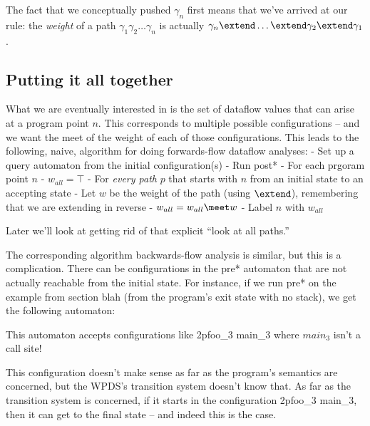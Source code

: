 \documentclass{article}
\newcommand{\config}{2}{\ensuremath{\langle #1, #2 \rangle}}
\begin{document}
\begin{defintion}
The fact that we conceptually pushed $\gamma_n$ first means that we've
arrived at our rule: the \emph{weight} of a path $\gamma_1 \gamma_2
\dots \gamma_n$ is actually $\gamma_n \extend \dots \extend \gamma_2
\extend \gamma_1$.







\subsection{Putting it all together}

What we are eventually interested in is the set of dataflow
values that can arise at a program point $n$. This corresponds to
multiple possible configurations -- and we want the meet of the weight
of each of those configurations. This leads to the following, naive,
algorithm for doing forwards-flow dataflow analyses:
    - Set up a query automaton from the initial configuration(s)
    - Run post*
    - For each prgoram point $n$
          - $w_{all} = \top$
          - For \emph{every path} $p$ that starts with $n$ from an
            initial state to an accepting state
              - Let $w$ be the weight of the path (using $\extend$),
                remembering that we are extending in reverse
              - $w_{all} = w_{all} \meet w$
          - Label $n$ with $w_{all}$

Later we'll look at getting rid of that explicit ``look at all
paths.''

The corresponding algorithm backwards-flow analysis is similar, but
this is a complication. There can be configurations in the pre*
automaton that are not actually reachable from the initial state. For
instance, if we run pre* on the example from section blah (from the
program's exit state with no stack), we get the following automaton:

This automaton accepts configurations like \config{p}{foo_3 main_3}
where $main_3$ isn't a call site!

This configuration doesn't make sense as far as the program's
semantics are concerned, but the WPDS's transition system doesn't know
that. As far as the transition system is concerned, if it starts in
the configuration \config{p}{foo_3 main_3}, then it can get to the
final state -- and indeed this is the case. 


\end{defintion}
\end{document}
